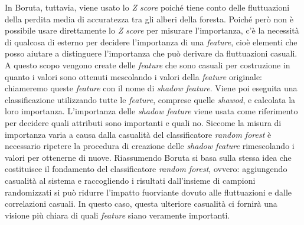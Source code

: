 \documentclass[12pt,italian]{report}
\begin{document}
	In Boruta, tuttavia, viene usato lo \textit{Z score} poiché tiene conto delle fluttuazioni della perdita media di accuratezza tra gli alberi della foresta. Poiché però non è possibile usare direttamente lo \textit{Z score} per misurare l'importanza, c'è la necessità di qualcosa di esterno per decidere l'importanza di una \textit{feature}, cioè elementi che posso aiutare a distinguere l'importanza che può derivare da fluttuazioni casuali. A questo scopo vengono create delle \textit{feature} che sono casuali per costruzione in quanto i valori sono ottenuti mescolando i valori della \textit{feature} originale: chiameremo queste \textit{feature} con il nome di \textit{shadow feature}. Viene poi eseguita una classificazione utilizzando tutte le \textit{feature}, comprese quelle \textit{shawod}, e calcolata la loro importanza. 
	L'importanza delle \textit{shadow feature} viene usata come riferimento per decidere quali attributi sono importanti e quali no. Siccome la misura di importanza varia a causa dalla casualità del classificatore \textit{random forest} è necessario ripetere la procedura di creazione delle \textit{shadow feature} rimescolando i valori per ottenerne di nuove.
	Riassumendo Boruta si basa sulla stessa idea che costituisce il fondamento del classificatore \textit{random forest}, ovvero: aggiungendo casualità al sistema e raccogliendo i risultati dall'insieme di campioni randomizzati si può ridurre l'impatto fuorviante dovuto alle  fluttuazioni e dalle correlazioni casuali. In questo caso, questa ulteriore casualità ci fornirà una visione più chiara di quali \textit{feature} siano veramente importanti.
	
\end{document}
